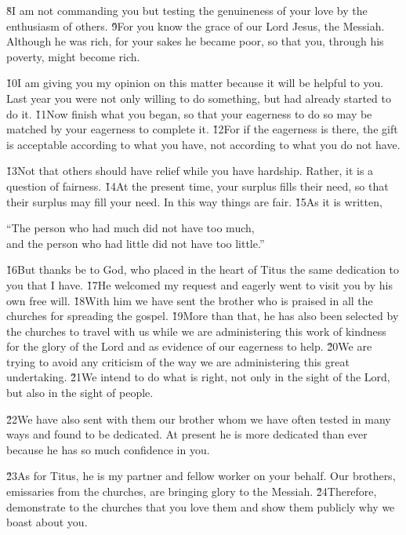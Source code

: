 \v{8}I am not commanding you but testing the genuineness of your love by the enthusiasm of others. \v{9}For you know the grace of our Lord Jesus, the Messiah. Although he was rich, for your sakes he became poor, so that you, through his poverty, might become rich.

\v{10}I am giving you my opinion on this matter because it will be helpful to you. Last year you were not only willing to do something, but had already started to do it. \v{11}Now finish what you began, so that your eagerness to do so may be matched by your eagerness to complete it. \v{12}For if the eagerness is there, the gift is acceptable according to what you have, not according to what you do not have.

\v{13}Not that others should have relief while you have hardship. Rather, it is a question of fairness. \v{14}At the present time, your surplus fills their need, so that their surplus may fill your need. In this way things are fair. \v{15}As it is written,

\begin{poetry}
\poeml ``The person who had much did not have too much, \\
\poemll    and the person who had little did not have too little.''
\end{poetry}

\v{16}But thanks be to God, who placed in the heart of Titus the same dedication to you that I have. \v{17}He welcomed my request and eagerly went to visit you by his own free will. \v{18}With him we have sent the brother who is praised in all the churches for spreading the gospel. \v{19}More than that, he has also been selected by the churches to travel with us while we are administering this work of kindness for the glory of the Lord and as evidence of our eagerness to help. \v{20}We are trying to avoid any criticism of the way we are administering this great undertaking. \v{21}We intend to do what is right, not only in the sight of the Lord, but also in the sight of people.

\v{22}We have also sent with them our brother whom we have often tested in many ways and found to be dedicated. At present he is more dedicated than ever because he has so much confidence in you.

\v{23}As for Titus, he is my partner and fellow worker on your behalf. Our brothers, emissaries from the churches, are bringing glory to the Messiah. \v{24}Therefore, demonstrate to the churches that you love them and show them publicly why we boast about you.

